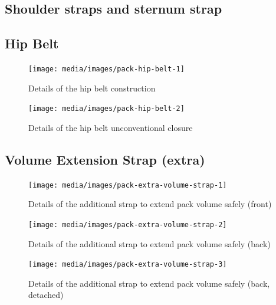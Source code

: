 \subsection{Shoulder straps and sternum strap}

\subsection{Hip Belt}

\begin{figure}[H]
  \texttt{[image: media/images/pack-hip-belt-1]}
  \caption{Details of the hip belt construction}
  \label{img:pack-hip-belt-1}
\end{figure}

\begin{figure}[H]
  \texttt{[image: media/images/pack-hip-belt-2]}
  \caption{Details of the hip belt unconventional closure}
  \label{img:pack-hip-belt-2}
\end{figure}

\subsection{Volume Extension Strap (extra)}

\begin{figure}[H]
  \texttt{[image: media/images/pack-extra-volume-strap-1]}
  \caption{Details of the additional strap to extend pack volume safely (front)}
  \label{img:pack-extra-volume-strap-1}
\end{figure}

\begin{figure}[H]
  \texttt{[image: media/images/pack-extra-volume-strap-2]}
  \caption{Details of the additional strap to extend pack volume safely (back)}
  \label{img:pack-extra-volume-strap-2}
\end{figure}

\begin{figure}[H]
  \texttt{[image: media/images/pack-extra-volume-strap-3]}
  \caption{Details of the additional strap to extend pack volume safely (back, detached)}
  \label{img:pack-extra-volume-strap-3}
\end{figure}
